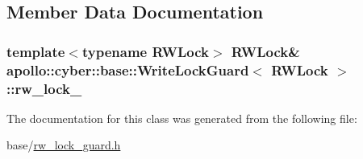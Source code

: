 \subsection{Member Data Documentation}
\hypertarget{classapollo_1_1cyber_1_1base_1_1WriteLockGuard_a264e9c6ed5cfedf882fa8a8d4b5e9918}{
\subsubsection[{rw\-\_\-lock\-\_\-}]{\setlength{\rightskip}{0pt plus 5cm}template$<$typename R\-W\-Lock$>$ R\-W\-Lock\& {\bf apollo\-::cyber\-::base\-::\-Write\-Lock\-Guard}$<$ R\-W\-Lock $>$\-::rw\-\_\-lock\-\_\-\hspace{0.3cm}{\ttfamily [private]}}}\label{classapollo_1_1cyber_1_1base_1_1WriteLockGuard_a264e9c6ed5cfedf882fa8a8d4b5e9918}


The documentation for this class was generated from the following file\-:\begin{DoxyCompactItemize}
\item 
base/\hyperlink{rw__lock__guard_8h}{rw\-\_\-lock\-\_\-guard.\-h}\end{DoxyCompactItemize}

